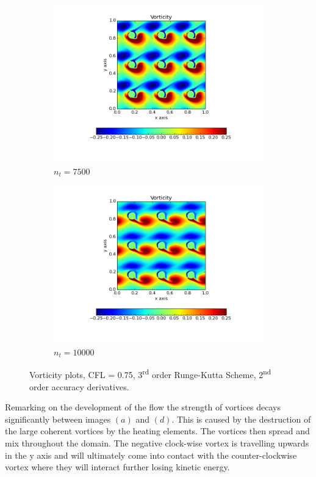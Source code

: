 \documentclass[10pt, a4paper]{article}
\begin{document}
\begin{figure}[!htb]
\begin{subfigure}{.5\textwidth}
  \includegraphics[width=1.1\linewidth, clip=true, trim=1cm 2cm 1cm 1cm]{q3_0003}
  \caption{$n_t = 7500$}
\end{subfigure}%
\begin{subfigure}{.5\textwidth}
  \centering
  \includegraphics[width=1.1\linewidth, clip=true, trim=1cm 2cm 1cm 1cm]{q3_0004}
  \caption{$n_t = 10000$}
\end{subfigure}
\caption{Vorticity plots, CFL = 0.75, 3\textsuperscript{rd} order Runge-Kutta Scheme, 2\textsuperscript{nd} order accuracy derivatives.}
\label{fig:q3}
\end{figure}

Remarking on the development of the flow the strength of vortices decays significantly between images $(a)$ and $(d)$. This is caused by the destruction of the large coherent vortices by the heating elements. The vortices then spread and mix throughout the domain. The negative clock-wise vortex is travelling upwards in the y axis and will ultimately come into contact with the counter-clockwise vortex where they will interact further losing kinetic energy.
\end{document}
